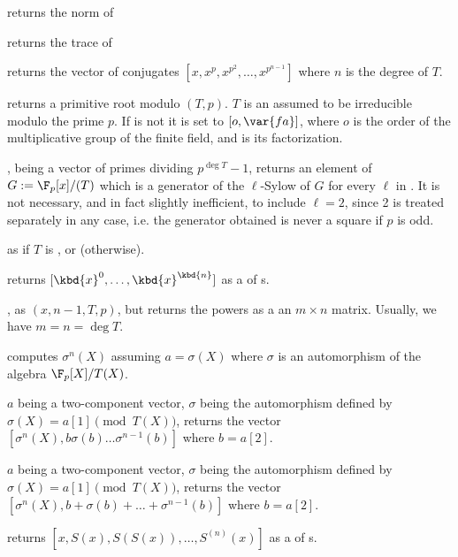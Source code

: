  returns the norm of 

 returns the trace of 

 returns the vector of conjugates
$[x,x^p,x^{p^2},\ldots,x^{p^{n-1}}]$ where $n$ is the degree of $T$.

 returns a primitive root modulo
$(T,p)$. $T$ is an  assumed to be irreducible modulo the prime
$p$. If  is not  it is set to $[o,\var{fa}]$, where $o$ is
the order of the multiplicative group of the finite field, and  is
its factorization.

,  being a vector of
primes dividing $p^{\deg T} - 1$, returns an element of $G:=\F_p[x]/(T)$
which is a generator of the $\ell$-Sylow of $G$ for every $\ell$ in
. It is not necessary, and in fact slightly inefficient, to include
$\ell=2$, since 2 is treated separately in any case, i.e. the generator
obtained is never a square if $p$ is odd.

 as
 if $T$ is ,
or  (otherwise).


 returns $[\kbd{x}^0,
\dots, \kbd{x}^\kbd{n}]$ as a  of s.

, as
$(x, n-1, T, p)$, but returns the powers as a an
$m\times n$ matrix. Usually, we have $m = n = \deg T$.

 computes $\sigma^n(X)$
assuming $a=\sigma(X)$ where $\sigma$ is an automorphism of the algebra
$\F_p[X]/T(X)$.

$a$ being a two-component vector,
$\sigma$ being the automorphism defined by $\sigma(X)=a[1]\pmod{T(X)}$,
returns the vector $[\sigma^n(X),b\sigma(b)\ldots\sigma^{n-1}(b)]$
where $b=a[2]$.

$a$ being a two-component vector,
$\sigma$ being the automorphism defined by $\sigma(X)=a[1]\pmod{T(X)}$,
returns the vector $[\sigma^n(X),b+\sigma(b)+\ldots+\sigma^{n-1}(b)]$
where $b=a[2]$.

 returns
$[x,S(x),S(S(x)),\dots,S^{(n)}(x)]$ as a  of s.

